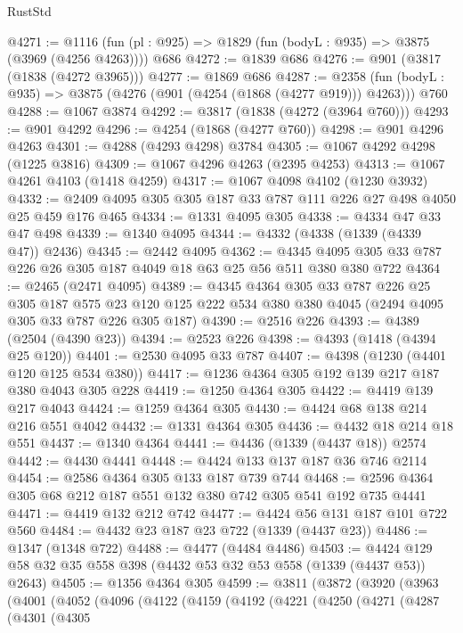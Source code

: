 \begin{lexlean}{RustStd}
\begin{coremodule}
@4271 := @1116 (fun (pl : @925) => @1829 (fun (bodyL : @935) => @3875 (@3969 (@4256 @4263)))) @686
@4272 := @1839 @686
@4276 := @901 (@3817 (@1838 (@4272 @3965)))
@4277 := @1869 @686
@4287 := @2358 (fun (bodyL : @935) => @3875 (@4276 (@901 (@4254 (@1868 (@4277 @919))) @4263))) @760
@4288 := @1067 @3874
@4292 := @3817 (@1838 (@4272 (@3964 @760)))
@4293 := @901 @4292
@4296 := @4254 (@1868 (@4277 @760))
@4298 := @901 @4296 @4263
@4301 := @4288 (@4293 @4298) @3784
@4305 := @1067 @4292 @4298 (@1225 @3816)
@4309 := @1067 @4296 @4263 (@2395 @4253)
@4313 := @1067 @4261 @4103 (@1418 @4259)
@4317 := @1067 @4098 @4102 (@1230 @3932)
@4332 := @2409 @4095 @305 @305 @187 @33 @787 @111 @226 @27 @498 @4050 @25 @459 @176 @465
@4334 := @1331 @4095 @305
@4338 := @4334 @47 @33 @47 @498
@4339 := @1340 @4095
@4344 := @4332 (@4338 (@1339 (@4339 @47)) @2436)
@4345 := @2442 @4095
@4362 := @4345 @4095 @305 @33 @787 @226 @26 @305 @187 @4049 @18 @63 @25 @56 @511 @380 @380 @722
@4364 := @2465 (@2471 @4095)
@4389 := @4345
    @4364
    @305
    @33
    @787
    @226
    @25
    @305
    @187
    @575
    @23
    @120
    @125
    @222
    @534
    @380
    @380
    @4045
    (@2494 @4095 @305 @33 @787 @226 @305 @187)
@4390 := @2516 @226
@4393 := @4389 (@2504 (@4390 @23))
@4394 := @2523 @226
@4398 := @4393 (@1418 (@4394 @25 @120))
@4401 := @2530 @4095 @33 @787
@4407 := @4398 (@1230 (@4401 @120 @125 @534 @380))
@4417 := @1236 @4364 @305 @192 @139 @217 @187 @380 @4043 @305 @228
@4419 := @1250 @4364 @305
@4422 := @4419 @139 @217 @4043
@4424 := @1259 @4364 @305
@4430 := @4424 @68 @138 @214 @216 @551 @4042
@4432 := @1331 @4364 @305
@4436 := @4432 @18 @214 @18 @551
@4437 := @1340 @4364
@4441 := @4436 (@1339 (@4437 @18)) @2574
@4442 := @4430 @4441
@4448 := @4424 @133 @137 @187 @36 @746 @2114
@4454 := @2586 @4364 @305 @133 @187 @739 @744
@4468 := @2596 @4364 @305 @68 @212 @187 @551 @132 @380 @742 @305 @541 @192 @735 @4441
@4471 := @4419 @132 @212 @742
@4477 := @4424 @56 @131 @187 @101 @722 @560
@4484 := @4432 @23 @187 @23 @722 (@1339 (@4437 @23))
@4486 := @1347 (@1348 @722)
@4488 := @4477 (@4484 @4486)
@4503 := @4424 @129 @58 @32 @35 @558 @398 (@4432 @53 @32 @53 @558 (@1339 (@4437 @53)) @2643)
@4505 := @1356 @4364 @305
@4599 := @3811
    (@3872
      (@3920
        (@3963
          (@4001
            (@4052
              (@4096
                (@4122
                  (@4159
                    (@4192
                      (@4221
                        (@4250
                          (@4271
                            (@4287
                              (@4301
                                (@4305

\end{coremodule}
\end{lexlean}
